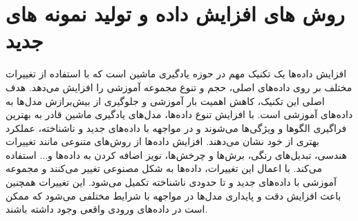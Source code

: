 %
%
%

%
%
%



\section{روش های افزایش داده و تولید نمونه های جدید}

افزایش داده‌ها یک تکنیک مهم در حوزه یادگیری ماشین است که با استفاده از تغییرات مختلف بر روی داده‌های اصلی، حجم و تنوع مجموعه آموزشی را افزایش می‌دهد. هدف اصلی این تکنیک، کاهش اهمیت بار آموزشی و جلوگیری از بیش‌برازش مدل‌ها به داده‌های آموزشی است. با افزایش تنوع داده‌ها، مدل‌های یادگیری ماشین قادر به بهترین فراگیری الگوها و ویژگی‌ها می‌شوند و در مواجهه با داده‌های جدید و ناشناخته، عملکرد بهتری از خود نشان می‌دهند.
\citep{ng2020ssmba}
افزایش داده‌ها از روش‌های متنوعی مانند تغییرات هندسی، تبدیل‌های رنگی، برش‌ها و چرخش‌ها، نویز اضافه کردن به داده‌ها و... استفاده می‌کند. با اعمال این تغییرات، داده‌ها به شکل مصنوعی تغییر می‌کنند و مجموعه آموزشی با داده‌های جدید و تا حدودی ناشناخته تکمیل می‌شود. این تغییرات همچنین باعث افزایش دقت و پایداری مدل‌ها در مواجهه با شرایط مختلفی می‌شود که ممکن است در داده‌های ورودی واقعی وجود داشته باشند.

